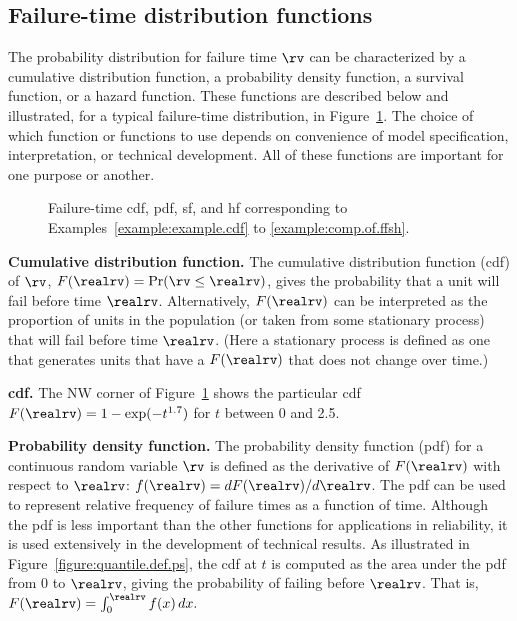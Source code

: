 \subsection{Failure-time distribution functions}
\label{section:ttf.functions}
The probability distribution for failure time $\rv$ can be
characterized by a cumulative distribution function, a probability
density function, a survival function, or a hazard function. These
functions are described below and illustrated, for a typical
failure-time distribution, in
Figure~\ref{figure:pdfcdfhazsf.ps}. The choice of which function or
functions to use depends on convenience of model specification,
interpretation, or technical development. All of these functions are
important for one purpose or another.\\[1ex]
\begin{figure}
\caption{Failure-time cdf, pdf, sf, and hf corresponding
to Examples~\ref{example:example.cdf} to \ref{example:comp.of.ffsh}.}
\label{figure:pdfcdfhazsf.ps}
\end{figure}

\noindent
{\bf Cumulative distribution function.}  The cumulative distribution
function (cdf) of $\rv$, $F(\realrv)=\Pr(\rv \le \realrv)$, gives the
probability that a unit will fail before time $\realrv$.
Alternatively, $F(\realrv)$ can be interpreted as the proportion of
units in the population (or taken from some stationary process) that
will fail before time $\realrv$.  (Here a stationary process is
defined as one that generates units that have a $F(\realrv)$ that
does not change over time.)

\begin{example}
\label{example:example.cdf}{\bf cdf.}
The NW corner of Figure~\ref{figure:pdfcdfhazsf.ps} shows the
particular cdf $F(\realrv)=1-\exp(-t^{1.7})$ for $t$ between 0 and
2.5.
\end{example}

\noindent
{\bf Probability density function.}  The probability density
function (pdf) for a continuous random variable $\rv$ is defined as
the derivative of $F(\realrv)$ with respect to $\realrv$:
$f(\realrv)=dF(\realrv)/d\realrv$. The pdf can be used to represent
relative frequency of failure times as a function of time.  Although
the pdf is less important than the other functions for applications
in reliability, it is used extensively in the development of
technical results.  As illustrated in
Figure~\ref{figure:quantile.def.ps}, the cdf at $t$ is computed as
the area under the pdf from $0$ to $\realrv$, giving the probability
of failing before $\realrv$. That is, $F(\realrv)=\int^\realrv_{0}
f(x)\, dx.$

